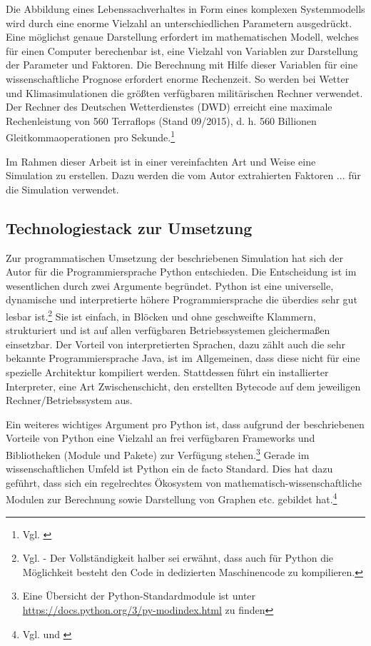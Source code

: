 \documentclass[12pt]{article}
\begin{document}
Die Abbildung eines Lebenssachverhaltes in Form eines komplexen Systemmodells wird durch eine enorme Vielzahl an unterschiedlichen Parametern ausgedrückt. Eine möglichst genaue Darstellung erfordert im mathematischen Modell, welches für einen Computer berechenbar ist, eine Vielzahl von Variablen zur Darstellung der Parameter und Faktoren. Die Berechnung mit Hilfe dieser Variablen für eine wissenschaftliche Prognose erfordert enorme Rechenzeit. So werden bei Wetter und Klimasimulationen die größten verfügbaren militärischen Rechner verwendet. Der Rechner des Deutschen Wetterdienstes (DWD) erreicht eine maximale Rechenleistung von 560 Terraflops (Stand 09/2015), d. h. 560 Billionen Gleitkommaoperationen pro Sekunde.\footnote{Vgl. \cite{WeltDerPhysik}}

Im Rahmen dieser Arbeit ist in einer vereinfachten Art und Weise eine Simulation zu erstellen. Dazu werden die vom Autor extrahierten Faktoren ... für die Simulation verwendet.

\subsection{Technologiestack zur Umsetzung}
Zur programmatischen Umsetzung der beschriebenen Simulation hat sich der Autor für die Programmiersprache Python entschieden. Die Entscheidung ist im wesentlichen durch zwei Argumente begründet. Python ist eine universelle, dynamische und interpretierte höhere Programmiersprache die überdies sehr gut lesbar ist.\footnote{Vgl. \cite{PythonGoodFor} - Der Vollständigkeit halber sei erwähnt, dass auch für Python die Möglichkeit besteht den Code in dedizierten Maschinencode zu kompilieren.} Sie ist einfach, in Blöcken und ohne geschweifte Klammern, strukturiert und ist auf allen verfügbaren Betriebssystemen gleichermaßen einsetzbar. Der Vorteil von interpretierten Sprachen, dazu zählt auch die sehr bekannte Programmiersprache Java, ist im Allgemeinen, dass diese nicht für eine spezielle Architektur kompiliert werden. Stattdessen führt ein installierter Interpreter, eine Art Zwischenschicht, den erstellten Bytecode auf dem jeweiligen Rechner/Betriebssystem aus.

Ein weiteres wichtiges Argument pro Python ist, dass aufgrund der beschriebenen Vorteile von Python eine Vielzahl an frei verfügbaren Frameworks und Bibliotheken (Module und Pakete) zur Verfügung stehen.\footnote{Eine Übersicht der Python-Standardmodule ist unter \url{https://docs.python.org/3/py-modindex.html} zu finden} Gerade im wissenschaftlichen Umfeld ist Python ein de facto Standard. Dies hat dazu geführt, dass sich ein regelrechtes Ökosystem von mathematisch-wissenschaftliche Modulen zur Berechnung sowie Darstellung von Graphen etc. gebildet hat.\footnote{Vgl. \cite{scipy} und \cite{dataquest}} 
\end{document}
